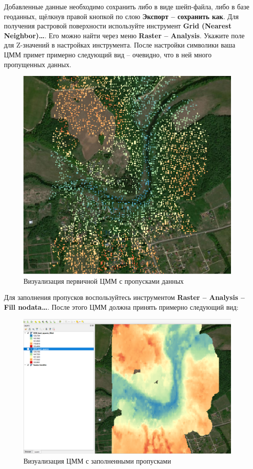 \documentclass[
  12pt,
]{book}
\begin{document}
Добавленные данные необходимо сохранить либо в виде шейп-файла, либо в базе геоданных, щёлкнув правой кнопкой по слою \textbf{Экспорт -- сохранить как}. Для получения растровой поверхности используйте инструмент \textbf{Grid (Nearest Neighbor)\ldots{}}. Его можно найти через меню \textbf{Raster -- Analysis}. Укажите поле для Z-значений в настройках инструмента. После настройки символики ваша ЦММ примет примерно следующий вид -- очевидно, что в ней много пропущенных данных.

\begin{figure}
\centering
\includegraphics{images/Ref14/DSM_gaps.png}
\caption{Визуализация первичной ЦММ с пропусками данных}
\end{figure}

Для заполнения пропусков воспользуйтесь инструментом \textbf{Raster -- Analysis -- Fill nodata\ldots{}}. После этого ЦММ должна принять примерно следующий вид:

\begin{figure}
\centering
\includegraphics{images/Ref14/DSM_filled.png}
\caption{Визуализация ЦММ с заполненными пропусками}
\end{figure}
\end{document}
